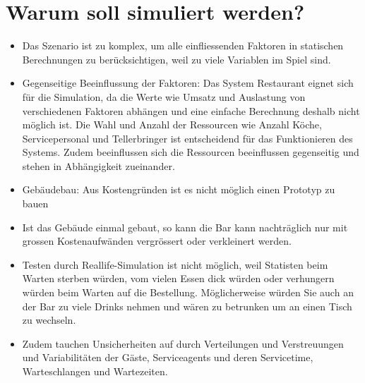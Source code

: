 \documentclass[ngerman,a4paper,12pt]{scrreprt}
\begin{document}
\section{Warum soll simuliert werden?}
	\begin{itemize}
		\item Das Szenario ist zu komplex, um alle einfliessenden Faktoren in statischen Berechnungen zu berücksichtigen, weil zu viele Variablen im Spiel sind.
		\item Gegenseitige Beeinflussung der Faktoren: Das System Restaurant eignet sich für die Simulation, da die Werte wie Umsatz und Auslastung von verschiedenen Faktoren abhängen und eine einfache Berechnung deshalb nicht möglich ist. Die Wahl und Anzahl der Ressourcen wie Anzahl Köche, Servicepersonal und Tellerbringer ist entscheidend für das Funktionieren des Systems. Zudem beeinflussen sich die Ressourcen beeinflussen gegenseitig und stehen in Abhängigkeit zueinander.
		\item Gebäudebau: Aus Kostengründen ist es nicht möglich einen Prototyp zu bauen
		\item Ist das Gebäude einmal gebaut, so kann die Bar kann nachträglich nur mit grossen Kostenaufwänden vergrössert oder verkleinert werden.
		\item Testen durch Reallife-Simulation ist nicht möglich, weil Statisten beim Warten sterben würden, vom vielen Essen dick würden oder verhungern würden beim Warten auf die Bestellung. Möglicherweise würden Sie auch an der Bar zu viele Drinks nehmen und wären zu betrunken um an einen Tisch zu wechseln.
		\item Zudem tauchen Unsicherheiten auf durch Verteilungen und Verstreuungen und Variabilitäten der Gäste, Serviceagents und deren Servicetime, Warteschlangen und Wartezeiten.
	\end{itemize}
\end{document}
